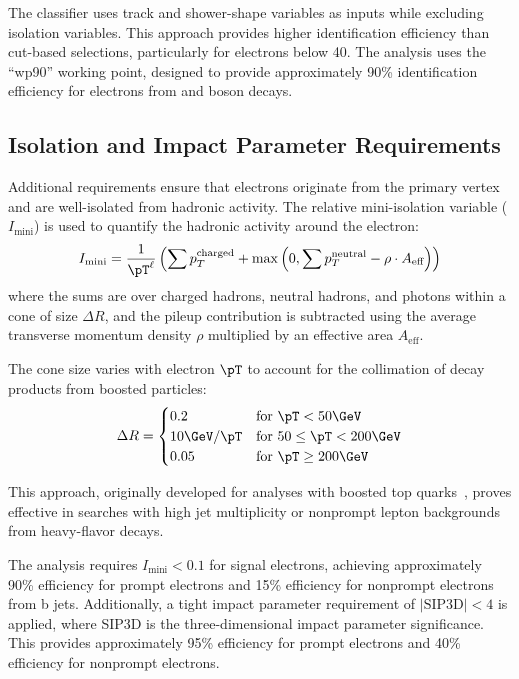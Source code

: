 The classifier uses track and shower-shape variables as inputs while excluding isolation variables. This approach provides higher identification efficiency than cut-based selections, particularly for electrons below 40\GeV. The analysis uses the ``wp90'' working point, designed to provide approximately 90\% identification efficiency for electrons from \PW and \PZ boson decays.

\subsection{Isolation and Impact Parameter Requirements}

Additional requirements ensure that electrons originate from the primary vertex and are well-isolated from hadronic activity. The relative mini-isolation variable ($I_{\text{mini}}$) is used to quantify the hadronic activity around the electron:
\begin{equation}
I_{\text{mini}} = \frac{1}{\pT^\ell}\left(\sum p_T^{\text{charged}} + \max\left(0, \sum p_T^{\text{neutral}} - \rho \cdot A_{\text{eff}}\right)\right)
\end{equation}
where the sums are over charged hadrons, neutral hadrons, and photons within a cone of size $\Delta R$, and the pileup contribution is subtracted using the average transverse momentum density $\rho$ multiplied by an effective area $A_{\text{eff}}$.

The cone size varies with electron $\pT$ to account for the collimation of decay products from boosted particles:
\begin{equation}
\Delta R = \begin{cases}
0.2 & \text{for } \pT < 50\GeV \\
10\GeV/\pT & \text{for } 50 \leq \pT < 200\GeV \\
0.05 & \text{for } \pT \geq 200\GeV
\end{cases}
\end{equation}

This approach, originally developed for analyses with boosted top quarks~\cite{Rehermann_MiniIso}, proves effective in searches with high jet multiplicity or nonprompt lepton backgrounds from heavy-flavor decays.

The analysis requires $I_{\text{mini}} < 0.1$ for signal electrons, achieving approximately 90\% efficiency for prompt electrons and 15\% efficiency for nonprompt electrons from b jets. Additionally, a tight impact parameter requirement of $|\text{SIP3D}| < 4$ is applied, where SIP3D is the three-dimensional impact parameter significance. This provides approximately 95\% efficiency for prompt electrons and 40\% efficiency for nonprompt electrons.


